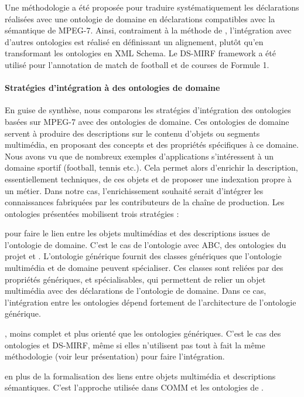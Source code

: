 Une méthodologie a été proposée pour traduire systématiquement les déclarations réalisées avec une ontologie de domaine en déclarations compatibles avec la sémantique de MPEG-7.
Ainsi, contraiment à la méthode de , l'intégration avec d'autres ontologies est réalisé en définissant un alignement, plutôt qu'en transformant les ontologies en XML Schema.
Le DS-MIRF framework a été utilisé pour l'annotation de match de football et de courses de Formule 1.


\paragraph{Stratégies d'intégration à des ontologies de domaine}\label{sec:strats-domaine}
En guise de synthèse, nous comparons les stratégies d'intégration des ontologies basées sur MPEG-7 avec des ontologies de domaine.
Ces ontologies de domaine servent à produire des descriptions sur le contenu d'objets ou segments multimédia, en proposant des concepts et des propriétés spécifiques à ce domaine. 
Nous avons vu que de nombreux exemples d'applications s'intéressent à un domaine sportif (football, tennis etc.).
Cela permet alors d'enrichir la description, essentiellement techniques, de ces objets et de proposer une indexation propre à un métier.
Dans notre cas, l'enrichissement souhaité serait d'intégrer les connaissances fabriquées par les contributeurs de la chaîne de production.
Les ontologies présentées mobilisent trois stratégies : 
\begin{liste}
	\item {} pour faire le lien entre les objets multimédias et des descriptions issues de l'ontologie de domaine. 
	C'est le cas de l'ontologie  avec ABC, des ontologies du projet  et .
	L'ontologie générique fournit des classes génériques que l'ontologie multimédia et de domaine peuvent spécialiser. 
	Ces classes sont reliées par des propriétés génériques, et spécialisables, qui permettent de relier un objet multimédia avec des déclarations de l'ontologie de domaine.
	Dans ce cas, l'intégration entre les ontologies dépend fortement de l'architecture de l'ontologie générique.

	\item {}, moins complet et plus orienté que les ontologies génériques.
	C'est le cas des ontologies  et DS-MIRF, même si elles n'utilisent pas tout à fait la même méthodologie (voir leur présentation) pour faire l'intégration.

	\item {} en plus de la formalisation des liens entre objets multimédia et descriptions sémantiques. 
	C'est l'approche utilisée dans COMM et les ontologies de .
\end{liste}

